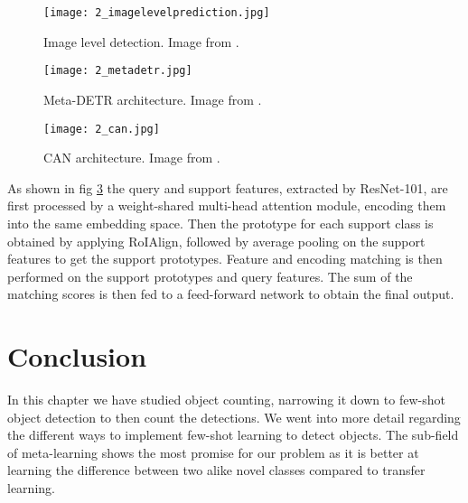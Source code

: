 \begin{figure}[h]
    \centering
    \texttt{[image: 2\_imagelevelprediction.jpg]}
    \caption{\label{fig:2_imagelevelprediction} Image level detection. Image from \citet{MetaDETR}.}
\end{figure}

\begin{figure}[h]
    \centering
    \texttt{[image: 2\_metadetr.jpg]}
    \caption{\label{fig:2_metadetr} Meta-DETR architecture. Image from \citet{MetaDETR}.}
\end{figure}

\begin{figure}[h]
    \centering
    \texttt{[image: 2\_can.jpg]}
    \caption{\label{fig:2_CAN} CAN architecture. Image from \citet{MetaDETR}.}
\end{figure}

As shown in fig \ref{fig:2_CAN} the query and support features, extracted by ResNet-101, are first processed by a weight-shared multi-head attention module, encoding them into the same embedding space. Then the prototype for each support class is obtained by applying RoIAlign, followed by average pooling on the support features to get the support prototypes. Feature and encoding matching is then performed on the support prototypes and query features. The sum of the matching scores is then fed to a feed-forward network to obtain the final output.

\section{Conclusion}
In this chapter we have studied object counting, narrowing it down to few-shot object detection to then count the detections. We went into more detail regarding the different ways to implement few-shot learning to detect objects. The sub-field of meta-learning shows the most promise for our problem as it is better at learning the difference between two alike novel classes compared to transfer learning.